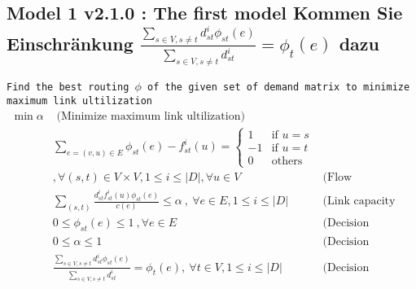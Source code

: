\documentclass{ctexart}
\begin{document}
\subsection{Model 1 v2.1.0 : The first model Kommen Sie Einschränkung $\frac{\sum_{s\in V,s\not=t}d_{st}^i\phi_{st}(e)}{\sum_{s\in V,s\not=t}d_{st}^i}=\phi_t(e)$ dazu}
\texttt{Find the best routing $\phi$ of the given set of demand matrix to minimize maximum link ultilization} 
\begin{equation}
	\begin{aligned}
		\min \alpha & \text{  (Minimize maximum link ultilization)}\\
		& \sum_{e=(v,u)\in E}\phi_{st}(e)-f_{st}^i(u)=\begin{cases}
			1 &\text{if } u=s \\
			-1 &\text{if } u=t \\
			0 &\text{others} 
		 \end{cases}\\
		& ,\forall (s,t)\in V\times V,1\leq i\leq|\textit{D}| , \forall u\in V & \text{(Flow conservation)}\\
		& \sum_{(s,t)}\frac{
			d_{st}^if_{st}^i(u)\phi_{st}(e)}{c(e)} \leq \alpha\ ,\ \forall e\in E,1\leq i\leq|\textit{D}| &  \text{(Link capacity constraint)} \\
		& 0\leq\phi_{st}(e)\leq1\ ,\forall e\in E\ & \text{(Decision variable constraint)}\\
		& 0\leq\alpha\leq1\ & \text{(Decision variable constraint)} \\
		& \frac{\sum_{s\in V,s\not=t}d_{st}^i\phi_{st}(e)}{\sum_{s\in V,s\not=t}d_{st}^i}=\phi_t(e),\ \forall t\in V,1\leq i \leq |\textit{D}| & \text{(Decision variable constraint)}
	\end{aligned}
\end{equation}
\end{document}
